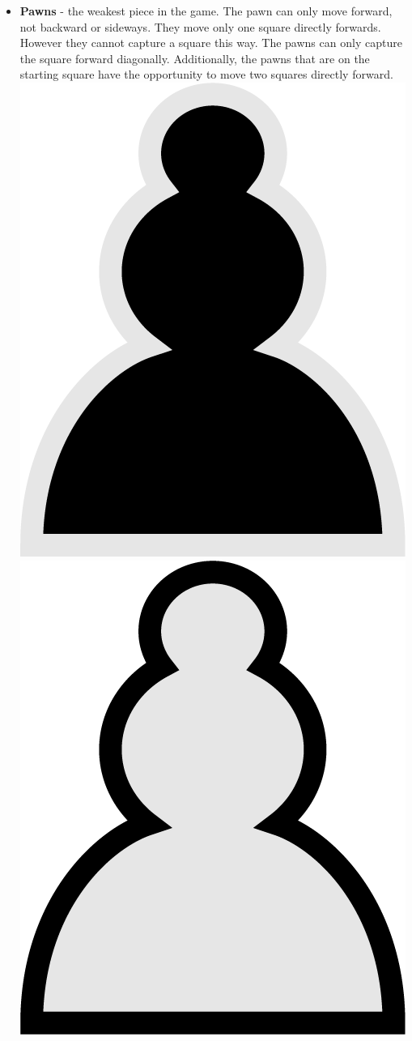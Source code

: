 \documentclass{article}
\begin{document}
\begin{itemize}
    \item \textbf{Pawns} - the weakest piece in the game. The pawn can only move forward, not backward or sideways. They move only one square directly forwards. However they cannot capture a square this way. The pawns can only capture the square forward diagonally. Additionally, the pawns that are on the starting square have the opportunity to move two squares directly forward.\\
    \includegraphics[scale=0.1]{image2.png}
    \includegraphics[scale=0.1]{image6.png}

\end{itemize}
\end{document}

